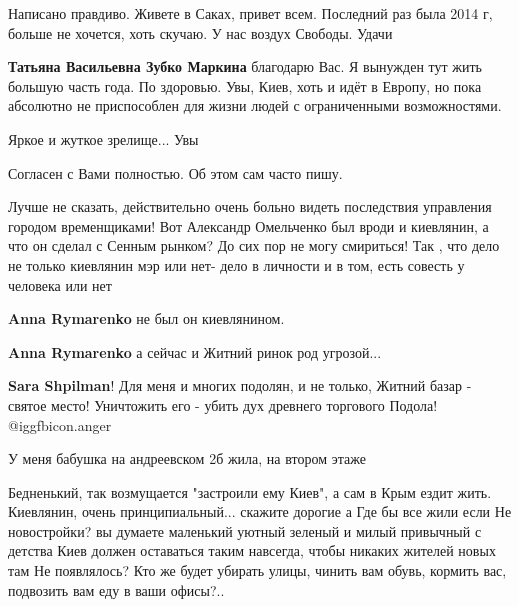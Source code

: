 \begin{itemize}

Написано правдиво. Живете в Саках, привет всем. Последний раз была 2014 г,
больше не хочется, хоть скучаю. У нас воздух Свободы. Удачи

\begin{itemize} %
\textbf{Татьяна Васильевна Зубко Маркина} благодарю Вас. Я вынужден тут жить большую часть года. По здоровью. Увы, Киев, хоть и идёт в Европу, но пока абсолютно не приспособлен для жизни людей с ограниченными возможностями.
\end{itemize} %

Яркое и жуткое зрелище... Увы

Согласен с Вами полностью.
Об этом сам часто пишу.


Лучше не сказать, действительно очень больно видеть последствия управления
городом временщиками! Вот Александр Омельченко был вроди и киевлянин, а что он
сделал с Сенным рынком? До сих пор не могу смириться! Так , что дело не только
киевлянин мэр или нет- дело в личности и в том, есть совесть у человека или нет

\begin{itemize} %
\textbf{Anna Rymarenko} не был он киевлянином.

\textbf{Anna Rymarenko} а сейчас и Житний ринок род угрозой...

\textbf{Sara Shpilman}! Для меня и многих подолян, и не только, Житний базар - святое место! Уничтожить его - убить дух древнего торгового Подола!  @igg{fbicon.anger} 
\end{itemize} %

У меня бабушка на андреевском 2б жила, на втором этаже


Бедненький, так возмущается "застроили ему Киев", а сам в Крым ездит жить.
Киевлянин, очень принципиальный... скажите дорогие а Где бы все жили если Не
новостройки? вы думаете маленький уютный зеленый и милый привычный с детства
Киев должен оставаться таким навсегда, чтобы никаких жителей новых там Не
появлялось? Кто же будет убирать улицы, чинить вам обувь, кормить вас,
подвозить вам еду в ваши офисы?..


\end{itemize}
